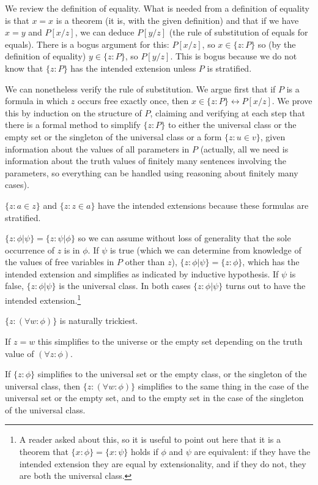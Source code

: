 \documentclass[12pt]{article}
\begin{document}
We review the definition of equality.  What is needed from a definition of equality is that $x=x$ is a theorem (it is, with the given definition) and that if we have $x=y$ and $P[x/z]$, we can deduce $P[y/z]$ (the rule of substitution of equals for equals).  There is a bogus argument for this:  $P[x/z]$, so $x \in \{z:P\}$ so (by the definition of equality) $y \in \{z:P\}$, so $P[y/z]$.  This is bogus because we do not know that $\{z:P\}$ has the intended extension unless $P$ is stratified.

We can nonetheless verify the rule of substitution.  We argue first that if $P$ is a formula in which $z$ occurs free exactly once,
then $x \in \{z:P\} \leftrightarrow P[x/z]$.  We prove this by induction on the structure of $P$, claiming and verifying at each step that there is a formal method to simplify $\{z:P\}$ to either the universal class or the empty set or the singleton of the universal class or a form $\{z:u \in v\}$, given information about the values of all parameters in $P$ (actually, all we need is information about the truth values of finitely  many sentences involving the parameters, so everything can be handled using reasoning about finitely many cases).  

$\{z:a \in z\}$ and
$\{z:z \in a\}$ have the intended extensions because these formulas are stratified.  

$\{z:\phi|\psi\} = \{z:\psi|\phi\}$  so we can assume without loss of generality that the sole occurrence of $z$ is in $\phi$.  If $\psi$ is true (which we can determine from knowledge of the values of free variables in $P$ other than $z$), $\{z:\phi|\psi\} =\{z:\phi\}$, which has the intended extension and simplifies as indicated by inductive hypothesis.  If $\psi$ is false, $\{z:\phi|\psi\}$ is the universal class.  In both cases $\{z:\phi|\psi\}$ turns out to have the intended extension.\footnote{A reader asked about this, so it is useful to point out here that it is a theorem that $\{x:\phi\} = \{x:\psi\}$ holds if $\phi$ and $\psi$ are equivalent:  if they have the intended extension they are equal by extensionality, and if they do not, they are both the universal class.}

$\{z:(\forall w:\phi)\}$ is naturally trickiest.  

If $z=w$ this simplifies to the universe or the empty set depending on the truth value of $(\forall z:\phi)$.  

If $\{z:\phi\}$ simplifies to the universal set or the empty class, or the singleton of the universal class, then  $\{z:(\forall w:\phi)\}$ simplifies to the same thing in the case of the universal set or the empty set, and to the empty set in the case of the singleton of the universal class.   
\end{document}
